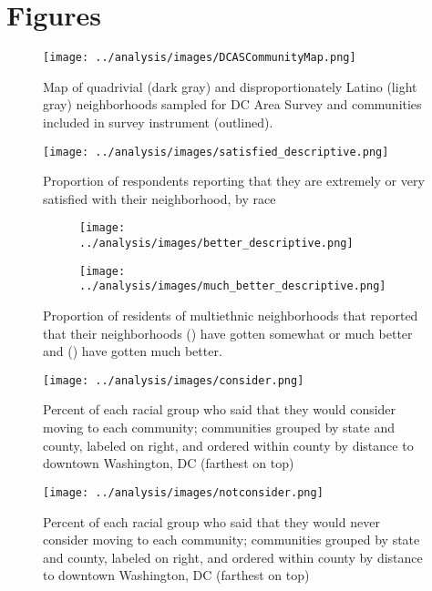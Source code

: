 \documentclass[11pt]{baderart}
\begin{document}
\clearpage
\section{Figures}
\begin{figure}
\texttt{[image: ../analysis/images/DCASCommunityMap.png]}
\caption{Map of quadrivial (dark gray) and disproportionately Latino (light gray) neighborhoods sampled for DC Area Survey and communities included in survey instrument (outlined).}
\label{fig:map}
\end{figure}

\begin{figure}[ht!]
\centering
\texttt{[image: ../analysis/images/satisfied\_descriptive.png]}
\caption{Proportion of respondents reporting that they are extremely or very satisfied with their neighborhood, by race}
\label{fig:satisfaction}
\end{figure}

\begin{sidewaysfigure}
\begin{subfigure}{.49\textwidth}
\texttt{[image: ../analysis/images/better\_descriptive.png]}
\caption{}
\label{subfig:better}
\end{subfigure}\quad\begin{subfigure}{.49\textwidth}
\texttt{[image: ../analysis/images/much\_better\_descriptive.png]}
\caption{}
\label{subfig:muchbetter}
\end{subfigure}
\caption{Proportion of residents of multiethnic neighborhoods that reported that their neighborhoods () have gotten somewhat or much better and () have gotten much better.}
\label{fig:improvement}
\end{sidewaysfigure}

\begin{sidewaysfigure}
\texttt{[image: ../analysis/images/consider.png]}
\caption{Percent of each racial group who said that they would consider moving to each community; communities grouped by state and county, labeled on right, and ordered within county by distance to downtown Washington, DC (farthest on top)}
\label{fig:consider}
\end{sidewaysfigure}

\begin{sidewaysfigure}
\texttt{[image: ../analysis/images/notconsider.png]}
\caption{Percent of each racial group who said that they would never consider moving to each community; communities grouped by state and county, labeled on right, and ordered within county by distance to downtown Washington, DC (farthest on top)}
\label{fig:notconsider}
\end{sidewaysfigure}
\end{document}
